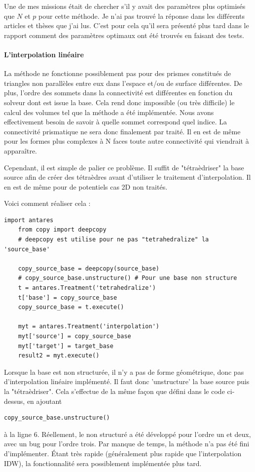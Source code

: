 Une de mes missions était de chercher s'il y avait des paramètres plus optimisés que \(N\) et \(p\) pour cette méthode. Je n'ai pas trouvé la réponse dans les différents articles\cite{idw-arcgis} et thèses que j'ai lus. C'est pour cela qu'il sera présenté plus tard dans le rapport comment des paramètres optimaux ont été trouvés en faisant des tests.


\label{prisme}\paragraph{L'interpolation linéaire}

La méthode ne fonctionne possiblement pas pour des prismes constitués de triangles non parallèles entre eux dans l'espace et/ou de surface différentes. De plus, l'ordre des sommets dans la connectivité est différentes en fonction du solveur dont est issue la base. Cela rend donc impossible (ou très difficile) le calcul des volumes tel que la méthode a été implémentée. Nous avons effectivement besoin de savoir à quelle sommet correspond quel indice. La connectivité prismatique ne sera donc finalement par traité. Il en est de même pour les formes plus complexes à N faces toute autre connectivité qui viendrait à apparaître.

Cependant, il est simple de palier ce problème. Il suffit de "tétraèdriser" la base source afin de créer des tétraèdres avant d'utiliser le traitement d'interpolation. Il en est de même pour de potentiels cas 2D non traités.

Voici comment réaliser cela :

\begin{lstlisting}[caption=Tetrahedralize pour interpoler linéairement tous types de cellules, label={lst:tet}]
    import antares
    from copy import deepcopy
    # deepcopy est utilise pour ne pas "tetrahedralize" la 'source_base' 
    
    copy_source_base = deepcopy(source_base)
    # copy_source_base.unstructure() # Pour une base non structure
    t = antares.Treatment('tetrahedralize')
    t['base'] = copy_source_base
    copy_source_base = t.execute()

    myt = antares.Treatment('interpolation')
    myt['source'] = copy_source_base
    myt['target'] = target_base
    result2 = myt.execute()
\end{lstlisting}

Lorsque la base est non structurée, il n'y a pas de forme géométrique, donc pas d'interpolation linéaire implémenté. Il faut donc 'unstructure' la base source puis la "tétraèdriser". Cela s'effectue de la même façon que défini dans le code ci-dessus, en ajoutant 
\begin{lstlisting}[]
    copy_source_base.unstructure()
\end{lstlisting}
à la ligne 6. Réellement, le non structuré a été développé pour l'ordre un et deux, avec un bug pour l'ordre trois. Par manque de temps, la méthode n'a pas été fini d'implémenter. Étant très rapide (généralement plus rapide que l'interpolation IDW), la fonctionnalité sera possiblement implémentée plus tard.


